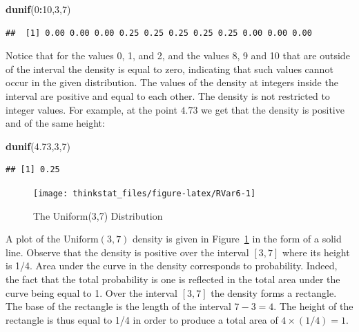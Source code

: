 \documentclass[]{krantz}
\makeatletter
\newenvironment{Shaded}{\begin{snugshade}}{\end{snugshade}}
\newcommand{\KeywordTok}[1]{\textcolor[rgb]{0.13,0.29,0.53}{\textbf{#1}}}
\newcommand{\DecValTok}[1]{\textcolor[rgb]{0.00,0.00,0.81}{#1}}
\newcommand{\FloatTok}[1]{\textcolor[rgb]{0.00,0.00,0.81}{#1}}
\newcommand{\OperatorTok}[1]{\textcolor[rgb]{0.81,0.36,0.00}{\textbf{#1}}}
\newcommand{\NormalTok}[1]{#1}
\newenvironment{kframe}{%
\medskip{}
\setlength{\fboxsep}{.8em}
 \def\at@end@of@kframe{}%
 \ifinner\ifhmode%
  \def\at@end@of@kframe{\end{minipage}}%
  \begin{minipage}{\columnwidth}%
 \fi\fi%
 \def\FrameCommand##1{\hskip\@totalleftmargin \hskip-\fboxsep
 \colorbox{shadecolor}{##1}\hskip-\fboxsep
     \hskip-\linewidth \hskip-\@totalleftmargin \hskip\columnwidth}%
 \MakeFramed {\advance\hsize-\width
   \@totalleftmargin\z@ \linewidth\hsize
   \@setminipage}}%
 {\par\unskip\endMakeFramed%
 \at@end@of@kframe}
\renewenvironment{Shaded}{\begin{kframe}}{\end{kframe}}
\theoremstyle{definition}
\theoremstyle{definition}
\theoremstyle{definition}
\theoremstyle{remark}
\makeatother
\begin{document}
\begin{Shaded}
\begin{Highlighting}[]
\KeywordTok{dunif}\NormalTok{(}\DecValTok{0}\OperatorTok{:}\DecValTok{10}\NormalTok{,}\DecValTok{3}\NormalTok{,}\DecValTok{7}\NormalTok{)}
\end{Highlighting}
\end{Shaded}

\begin{verbatim}
##  [1] 0.00 0.00 0.00 0.25 0.25 0.25 0.25 0.25 0.00 0.00 0.00
\end{verbatim}

Notice that for the values 0, 1, and 2, and the values 8, 9 and 10 that
are outside of the interval the density is equal to zero, indicating
that such values cannot occur in the given distribution. The values of
the density at integers inside the interval are positive and equal to
each other. The density is not restricted to integer values. For
example, at the point \(4.73\) we get that the density is positive and
of the same height:

\begin{Shaded}
\begin{Highlighting}[]
\KeywordTok{dunif}\NormalTok{(}\FloatTok{4.73}\NormalTok{,}\DecValTok{3}\NormalTok{,}\DecValTok{7}\NormalTok{)}
\end{Highlighting}
\end{Shaded}

\begin{verbatim}
## [1] 0.25
\end{verbatim}

\begin{figure}

{\centering \texttt{[image: thinkstat\_files/figure-latex/RVar6-1]} 

}

\caption{The Uniform(3,7) Distribution}\label{fig:RVar6}
\end{figure}

A plot of the \(\mathrm{Uniform}(3,7)\) density is given in
Figure~\ref{fig:RVar6} in the form of a solid line. Observe that the
density is positive over the interval \([3,7]\) where its height is 1/4.
Area under the curve in the density corresponds to probability. Indeed,
the fact that the total probability is one is reflected in the total
area under the curve being equal to 1. Over the interval \([3,7]\) the
density forms a rectangle. The base of the rectangle is the length of
the interval \(7-3=4\). The height of the rectangle is thus equal to 1/4
in order to produce a total area of \(4 \times (1/4) = 1\).
\end{document}
